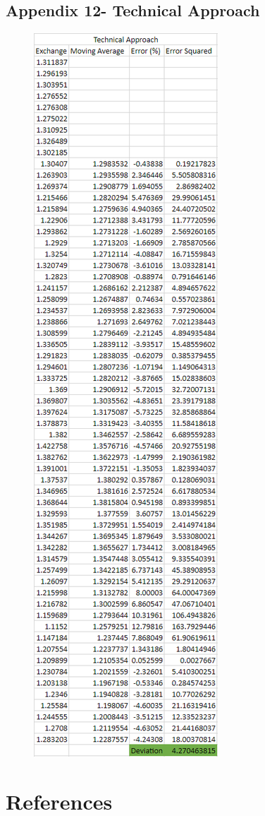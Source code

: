 \documentclass{article}
\let\Oldsubsection\subsection
\renewcommand{\subsection}{\FloatBarrier\Oldsubsection}
\begin{document}
\subsection*{Appendix 12- Technical Approach}
\begin{figure}[h!]
    \centering
    \includegraphics[scale=0.5]{graphs/app12.png}
\end{figure}

\FloatBarrier

\section*{References}
\end{document}
